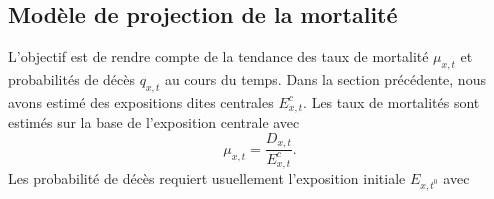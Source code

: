 \subsection{Modèle de projection de la mortalité}
L'objectif est de rendre compte de la tendance des taux de mortalité $\mu_{x,t}$ et probabilités de décès $q_{x,t}$ au cours du temps. Dans la section précédente, nous avons estimé des expositions dites centrales $E_{x,t}^c$. Les taux de mortalités sont estimés sur la base de l'exposition centrale avec 
$$
\mu_{x,t} = \frac{D_{x,t}}{E_{x,t}^c}.
$$
Les probabilité de décès requiert usuellement l'exposition initiale $E_{x,t^0}$ avec 


